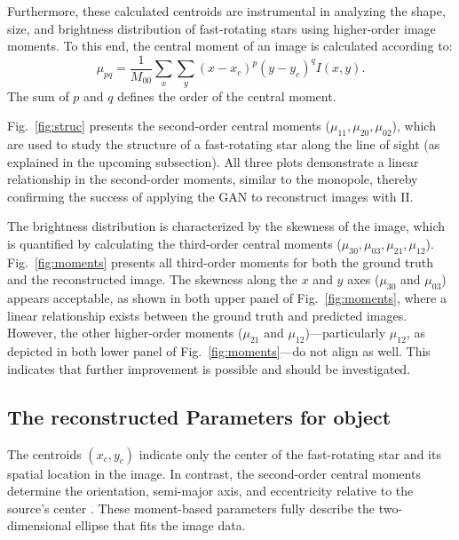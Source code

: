 Furthermore, these calculated centroids are instrumental in analyzing the shape, size, and brightness distribution of fast-rotating stars using higher-order image moments. To this end, the central moment of an image is calculated according to:
\begin{equation}
	\mu_{pq} = \frac{1}{M_{00}}\sum_{x} \sum_{y} (x - x_c)^p (y - y_c)^q I(x, y).
\end{equation}
The sum of \(p\) and \(q\) defines the order of the central moment. 

Fig.~\ref{fig:struc} presents the second-order central moments (\(\mu_{11}, \mu_{20}, \mu_{02}\)), which are used to study the structure of a fast-rotating star along the line of sight (as explained in the upcoming subsection). All three plots demonstrate a linear relationship in the second-order moments, similar to the monopole, thereby confirming the success of applying the GAN to reconstruct images with II.

The brightness distribution is characterized by the skewness of the image, which is quantified by calculating the third-order central moments (\(\mu_{30}, \mu_{03}, \mu_{21}, \mu_{12}\)). Fig.~\ref{fig:moments} presents all third-order moments for both the ground truth and the reconstructed image. The skewness along the $x$ and $y$ axes (\(\mu_{30}\) and \(\mu_{03}\)) appears acceptable, as shown in both upper panel of Fig.~\ref{fig:moments}, where a linear relationship exists between the ground truth and predicted images. However, the other higher-order moments (\(\mu_{21}\) and \(\mu_{12}\))—particularly \(\mu_{12}\), as depicted in both lower panel of Fig.~\ref{fig:moments}—do not align as well. This indicates that further improvement is possible and should be investigated.

\subsection{The reconstructed Parameters for object}
The centroids \((x_c, y_c)\) indicate only the center of the fast-rotating star and its spatial location in the image. In contrast, the second-order central moments determine the orientation, semi-major axis, and eccentricity relative to the source's center \citep{teague1980image}. These moment-based parameters fully describe the two-dimensional ellipse that fits the image data.

